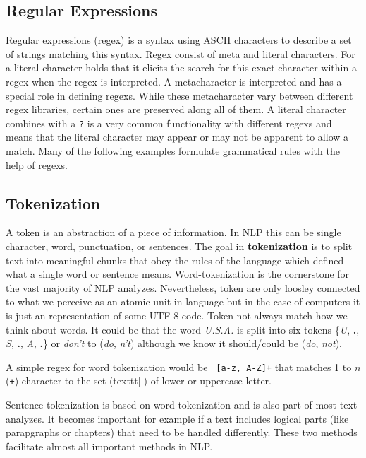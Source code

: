 \subsection{Regular Expressions}
Regular expressions (\gls{regex}) is a syntax using ASCII characters to describe a set of strings matching this syntax. Regex consist of meta and literal characters. For a literal character holds that it elicits the search for this exact character within a regex when the regex is interpreted. A metacharacter is interpreted and has a special role in defining regexs. While these metacharacter vary between different regex libraries, certain ones are preserved along all of them. A literal character combines with a \texttt{?} is a very common functionality with different regexs and means that the literal character may appear or may not be apparent to allow a match. Many of the following examples formulate grammatical rules with the help of regexs.

\subsection{Tokenization}
A token is an abstraction of a piece of information. In NLP this can be
single character, word, punctuation, or sentences. The goal in \textbf{tokenization} is
to split text into meaningful chunks that obey the rules of the language which defined
what a single word or sentence means. Word-tokenization is the cornerstone for the vast majority of NLP analyzes.
Nevertheless, token are only loosley connected to what we perceive as an atomic unit in language but in the case of computers it is just an representation of some UTF-8 code. Token not always match how we think about words. It could be that the word \textit{U.S.A.} is split into six tokens \{\textit{U}, \textbf{.}, \textit{S}, \textbf{.}, \textit{A}, \textbf{.}\} or \textit{don't} to (\textit{do}, \textit{n't}) although we know it should/could be (\textit{do}, \textit{not}).

A simple regex for word tokenization would be \texttt{
[a-z, A-Z]+} that matches 1 to $n$ (\texttt{+}) character to the set (texttt{[]}) of lower or uppercase letter.

Sentence tokenization is based on word-tokenization and is also part of most text analyzes. It becomes important for example if a text includes logical parts (like parapgraphs or chapters) that need to be handled differently.
These two methods facilitate almost all important methods in NLP.

